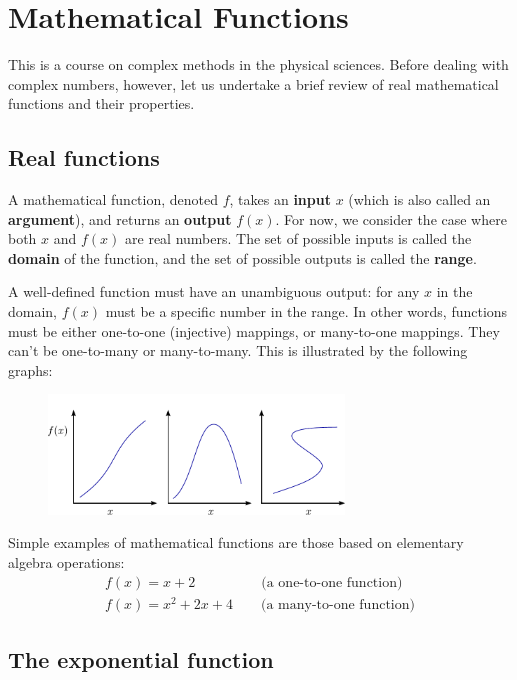 \documentclass[10pt,a4paper]{article}
\begin{document}
    
\section{Mathematical Functions}\label{mathematical-functions}

This is a course on complex methods in the physical sciences. Before
dealing with complex numbers, however, let us undertake a brief review
of real mathematical functions and their properties.

\subsection{Real functions}\label{real-functions}

A mathematical function, denoted $f$, takes an \textbf{input} $x$
(which is also called an \textbf{argument}), and returns an
\textbf{output} $f(x)$. For now, we consider the case where both $x$
and $f(x)$ are real numbers. The set of possible inputs is called the
\textbf{domain} of the function, and the set of possible outputs is
called the \textbf{range}.

A well-defined function must have an unambiguous output: for any $x$
in the domain, $f(x)$ must be a specific number in the range. In other
words, functions must be either one-to-one (injective) mappings, or
many-to-one mappings. They can't be one-to-many or many-to-many. This is
illustrated by the following graphs:

\begin{figure}[h]
  \centering\includegraphics[width=0.7\textwidth]{mathfunctions}
\end{figure}

Simple examples of mathematical functions are those based on elementary
algebra operations:
\begin{align*}
  f(x) = x + 2 \,\;\;\qquad\qquad \text{(a one-to-one function)} \\
  f(x) = x^2 + 2x + 4 \qquad \text{(a many-to-one function)}
\end{align*}

\subsection{The exponential function}
\end{document}
